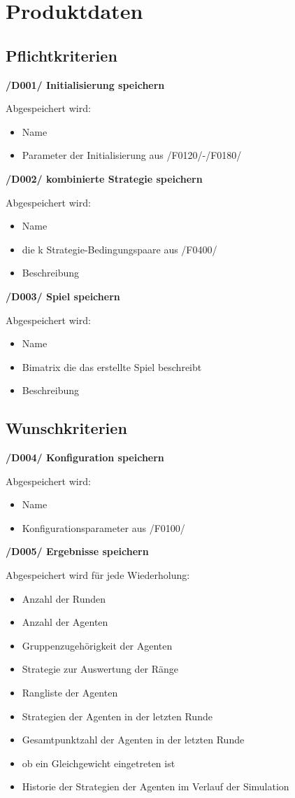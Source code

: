 \section{Produktdaten}

\subsection{Pflichtkriterien}

\textbf{/D001/ Initialisierung speichern}

Abgespeichert wird:
\begin{itemize}
\item Name
\item Parameter der Initialisierung aus /F0120/-/F0180/
\end{itemize}

\textbf{/D002/ kombinierte Strategie speichern}

Abgespeichert wird:
\begin{itemize}
\item Name
\item die k Strategie-Bedingungspaare aus /F0400/ 
\item Beschreibung
\end{itemize}

\textbf{/D003/ Spiel speichern}

Abgespeichert wird:
\begin{itemize}
\item Name 
\item Bimatrix die das erstellte Spiel beschreibt
\item Beschreibung
\end{itemize}

\subsection{Wunschkriterien}

\textbf{/D004/ Konfiguration speichern}

Abgespeichert wird:
\begin{itemize}
\item Name
\item Konfigurationsparameter aus /F0100/
\end{itemize}

\textbf{/D005/ Ergebnisse speichern}	

Abgespeichert wird für jede Wiederholung:
\begin{itemize}
\item Anzahl der Runden
\item Anzahl der Agenten
\item Gruppenzugehörigkeit der Agenten
\item Strategie zur Auswertung der Ränge
\item Rangliste der Agenten
\item Strategien der Agenten in der letzten Runde
\item Gesamtpunktzahl der Agenten in der letzten Runde
\item ob ein Gleichgewicht eingetreten ist
\item Historie der Strategien der Agenten im Verlauf der Simulation
\end{itemize}